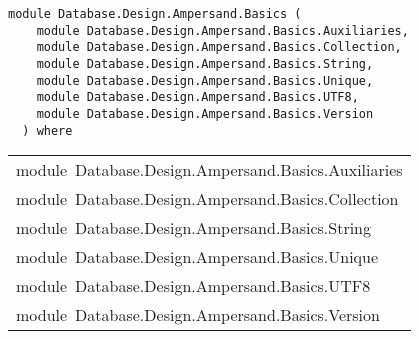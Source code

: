 \label{module:Database.Design.Ampersand.Basics}
\haddockbeginheader
{\haddockverb\begin{verbatim}
module Database.Design.Ampersand.Basics (
    module Database.Design.Ampersand.Basics.Auxiliaries, 
    module Database.Design.Ampersand.Basics.Collection, 
    module Database.Design.Ampersand.Basics.String, 
    module Database.Design.Ampersand.Basics.Unique, 
    module Database.Design.Ampersand.Basics.UTF8, 
    module Database.Design.Ampersand.Basics.Version
  ) where\end{verbatim}}
\haddockendheader

\begin{haddockdesc}
\item[\begin{tabular}{@{}l}
module\ Database.Design.Ampersand.Basics.Auxiliaries\\module\ Database.Design.Ampersand.Basics.Collection\\module\ Database.Design.Ampersand.Basics.String\\module\ Database.Design.Ampersand.Basics.Unique\\module\ Database.Design.Ampersand.Basics.UTF8\\module\ Database.Design.Ampersand.Basics.Version
\end{tabular}]
\end{haddockdesc}